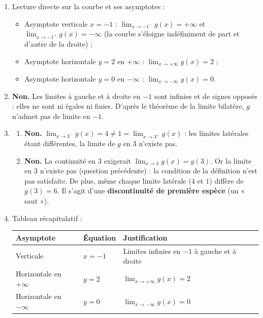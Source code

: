 \documentclass[11pt]{article}
\begin{document}
\begin{corrige}
\begin{enumerate}
\item Lecture directe sur la courbe et ses asymptotes :
\begin{itemize}
\item Asymptote verticale $x=-1$ : $\displaystyle\lim_{x\to -1^-}g(x)=+\infty$ et $\displaystyle\lim_{x\to -1^+}g(x)=-\infty$ (la courbe s'éloigne indéfiniment de part et d'autre de la droite) ;
\item Asymptote horizontale $y=2$ en $+\infty$ : $\displaystyle\lim_{x\to +\infty}g(x)=2$ ;
\item Asymptote horizontale $y=0$ en $-\infty$ : $\displaystyle\lim_{x\to -\infty}g(x)=0$.
\end{itemize}
\item \textbf{Non.} Les limites à gauche et à droite en $-1$ sont infinies et de signes opposés : elles ne sont ni égales ni finies. D'après le théorème de la limite bilatère, $g$ n'admet pas de limite en $-1$.
\item \begin{enumerate}
\item \textbf{Non.} $\displaystyle\lim_{x\to 3^-}g(x)=4\neq 1=\displaystyle\lim_{x\to 3^+}g(x)$ : les limites latérales étant différentes, la limite de $g$ en $3$ n'existe pas.
\item \textbf{Non.} La continuité en $3$ exigerait $\lim_{x\to 3}g(x)=g(3)$. Or la limite en $3$ n'existe pas (question précédente) : la condition de la définition n'est pas satisfaite. De plus, même chaque limite latérale ($4$ et $1$) diffère de $g(3)=6$. Il s'agit d'une \textbf{discontinuité de première espèce} (un « saut »).
\end{enumerate}
\item Tableau récapitulatif :
\begin{center}
\begin{tabularx}{\linewidth}{|l|X|X|}\hline
\rowcolor{popblueL}
\textbf{Asymptote} & \textbf{Équation} & \textbf{Justification} \\ \hline
Verticale & $x=-1$ & Limites infinies en $-1$ à gauche et à droite \\ \hline
Horizontale en $+\infty$ & $y=2$ & $\lim_{x\to +\infty}g(x)=2$ \\ \hline
Horizontale en $-\infty$ & $y=0$ & $\lim_{x\to -\infty}g(x)=0$ \\ \hline
\end{tabularx}

\end{center}
\end{enumerate}
\end{corrige}
\end{document}
